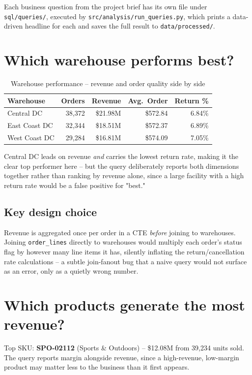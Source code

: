 \documentclass[11pt,a4paper]{report}
\begin{document}
Each business question from the project brief has its own file under
\texttt{sql/queries/}, executed by \texttt{src/analysis/run\_queries.py},
which prints a data-driven headline for each and saves the full result to
\texttt{data/processed/}.

\section{Which warehouse performs best?}

\begin{table}[H]
\centering
\caption{Warehouse performance -- revenue and order quality side by side}
\begin{tabular}{lrrrr}
\toprule
\textbf{Warehouse} & \textbf{Orders} & \textbf{Revenue} & \textbf{Avg.\ Order} & \textbf{Return \%} \\
\midrule
Central DC & 38{,}372 & \$21.98M & \$572.84 & 6.84\% \\
East Coast DC & 32{,}344 & \$18.51M & \$572.37 & 6.89\% \\
West Coast DC & 29{,}284 & \$16.81M & \$574.09 & 7.05\% \\
\bottomrule
\end{tabular}
\end{table}

Central DC leads on revenue \emph{and} carries the lowest return rate,
making it the clear top performer here -- but the query deliberately
reports both dimensions together rather than ranking by revenue alone,
since a large facility with a high return rate would be a false positive
for "best."

\subsection*{Key design choice}
Revenue is aggregated once per order in a CTE \emph{before} joining to
warehouses. Joining \texttt{order\_lines} directly to warehouses would
multiply each order's status flag by however many line items it has,
silently inflating the return/cancellation rate calculations -- a subtle
join-fanout bug that a naive query would not surface as an error, only as
a quietly wrong number.

\section{Which products generate the most revenue?}

Top SKU: \textbf{SPO-02112} (Sports \& Outdoors) -- \$12.08M from 39{,}234
units sold. The query reports margin alongside revenue, since a
high-revenue, low-margin product may matter less to the business than it
first appears.
\end{document}
